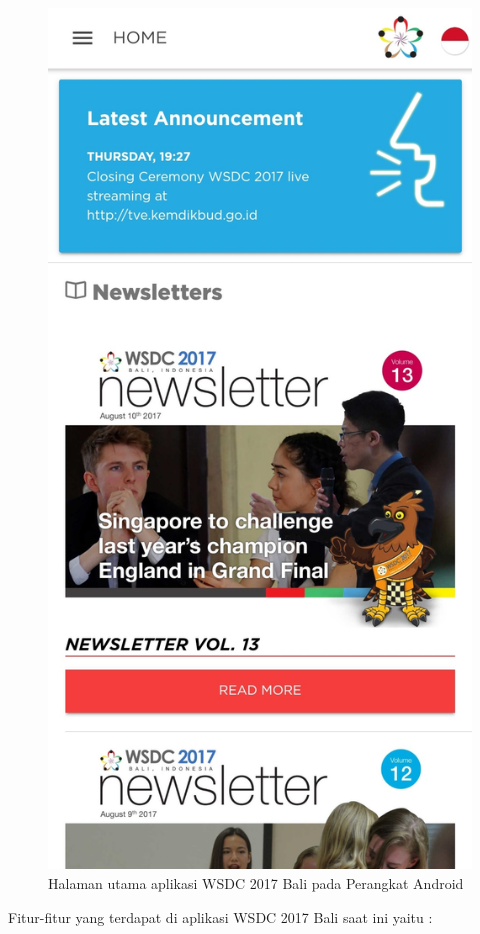 \begin{figure}[H]
    \centering
    \includegraphics[scale=0.12]{Gambar/WSDC2017-App.jpg}
    \caption{Halaman utama aplikasi WSDC 2017 Bali pada Perangkat Android}
    \label{fig:wsdcapp}
\end{figure}
\newpage
Fitur-fitur yang terdapat di aplikasi WSDC 2017 Bali saat ini yaitu :

